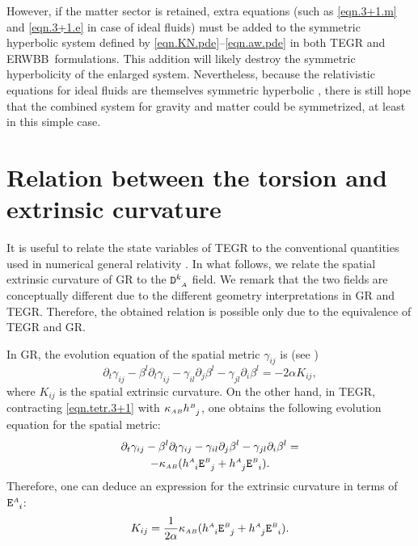 \documentclass[
10pt, %
a4paper, %
oneside, %
twocolumn,
headinclude,footinclude, %
BCOR5mm, %
]{scrartcl}
\newcommand{\ERWBB}{{ERWBB}}
\newcommand{\sA}{\mathsmaller A}
\newcommand{\sB}{\mathsmaller B}
\newcommand{\pd}[1]{\partial_{#1}}
\newcommand{\mg}[1]{\kappa_{#1}}			%
\newcommand{\tetrsymbol}{h}
\newcommand{\tetr}[2]{\tetrsymbol^{#1}_{\phantom{#1}#2}}
\newcommand{\detTetr}{\tetrsymbol}
\newcommand{\Dfin}[2]{\mathtt{D}_{\phantom{#2}#1}^{#2}}	%
\newcommand{\Efin}[2]{\mathtt{E}^{#1}_{\phantom{#1}#2}}	%
\newcommand{\shift}[1]{\beta^{#1}}
\begin{document}
	However, if the matter sector is retained, extra equations (such as
	\eqref{eqn.3+1.m} and \eqref{eqn.3+1.e} in case of ideal fluids) must be
	added to the symmetric hyperbolic system defined by
	\eqref{eqn.KN.pde}--\eqref{eqn.aw.pde} in both TEGR and \ERWBB\
	formulations. This addition will likely destroy the symmetric hyperbolicity
	of the enlarged system. Nevertheless, because the relativistic equations for
	ideal fluids are themselves symmetric hyperbolic \cite{Ruggeri1981Euler},
	there is still hope that the combined system for gravity and matter could be
	symmetrized, at least in this simple case.


	
	\section{Relation between the torsion and extrinsic curvature}
	
	It is useful to relate the state variables of TEGR to the conventional quantities used in 
	numerical 
	general relativity \cite{ADM2008,Baumgarte2003a,Gourgoulhon2012a}. In 
	what follows, we relate the spatial extrinsic curvature of GR to the $ \Dfin{\sA}{k} $ field. 
	We remark 
	that the two fields are conceptually different due to the different geometry interpretations in 
	GR and TEGR. Therefore, the obtained relation is possible only due to the equivalence of TEGR 
	and GR. 
	
	In GR, the evolution equation of the spatial metric $ \gamma_{ij} $ is (see 
	\cite[Eq.(7.64)]{RezzollaZanottiBook})
	\begin{equation}\label{eqn.K}
		\pd{t} \gamma_{ij} - \shift{l}\pd{l}\gamma_{ij} - \gamma_{il}\pd{j}\shift{l}
		-\gamma_{jl}\pd{i}\shift{l} = - 2 \alpha K_{ij},
	\end{equation}
	where  $ K_{ij} $ is the spatial extrinsic 
	curvature.
	On the other hand, in TEGR, contracting \eqref{eqn.tetr.3+1} with $ \mg{\sA\sB} \tetr{\sB}{j} 
	$, one 
	obtains 
	the following evolution equation for the spatial metric:
	\begin{multline}\label{eqn.gamma.PDE}
		\pd{t} \gamma_{ij} - \shift{l}\pd{l}\gamma_{ij} - \gamma_{il}\pd{j}\shift{l}
		-\gamma_{jl}\pd{i}\shift{l} = \\
		-\mg{\sA\sB}(\tetr{\sA}{i} \Efin{\sB}{j} + \tetr{\sA}{j} 
		\Efin{\sB}{i}).
	\end{multline} 
	Therefore, one can deduce an expression for the extrinsic curvature in terms of $ 
	\Efin{\sA}{i} $: 
	\begin{equation}\label{key}
		K_{ij} = \frac{1}{2\alpha}\mg{\sA\sB}(\tetr{\sA}{i} \Efin{\sB}{j} + \tetr{\sA}{j} 
		\Efin{\sB}{i}).
	\end{equation}
	
\end{document}
